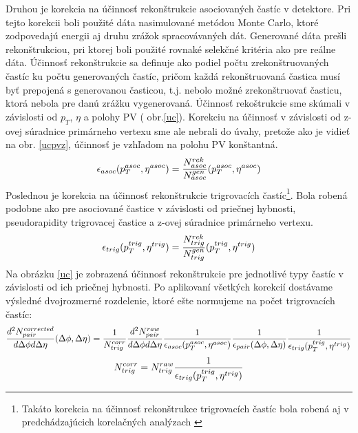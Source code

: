 \documentclass[thesismargins, thesislinespacing]{rnthesis}
\begin{document}
Druhou je korekcia na účinnosť rekonštrukcie asociovaných častíc v detektore. Pri tejto korekcii boli použité dáta nasimulované metódou Monte Carlo, ktoré zodpovedajú energii aj druhu zrážok spracovávaných dát. Generované dáta prešli re\-kon\-štruk\-ciou, pri ktorej boli použité rovnaké selekčné kritéria ako pre reálne dáta.  Účinnosť re\-kon\-štruk\-cie sa definuje ako podiel počtu zrekonštruovaných častíc ku počtu generovaných častíc, pričom každá rekonštruovaná častica musí byť prepojená s generovanou časticou, t.j. nebolo možné zrekonštruovať časticu, ktorá nebola pre danú zrážku vygenerovaná. Účinnosť rekoštrukcie sme skúmali v závislosti od $p_T$, $\eta$ a polohy PV ( obr.\ref{uc}). Korekciu na účinnosť v závislosti od z-ovej súradnice primárneho vertexu sme ale nebrali do úvahy, pretože ako je vidieť na obr. \ref{ucpvz}, účinnosť je vzhľadom na polohu PV konštantná.   
\begin{equation}
\footnotesize
\epsilon_{asoc}(p_{T}^{asoc},\eta^{asoc}) = \frac{N_{asoc}^{rek}}{N_{asoc}^{gen}}(p_{T}^{asoc},\eta^{asoc})
\end{equation}
Poslednou je korekcia na účinnosť rekonštrukcie trigrovacích častíc\footnote{Takáto korekcia na účinnosť rekonštrukce trigrovacích častíc bola robená aj v predchádzajúcich korelačných analýzach \cite{Jan-Fiete}}. Bola robená podobne ako pre asociované častice v závislosti od priečnej hybnosti, pseudorapidity trigrovacej častice a z-ovej súradnice primárneho vertexu. 
\begin{equation}
\footnotesize
\epsilon_{trig}(p_{T}^{trig},\eta^{trig}) = \frac{N_{trig}^{rek}}{N_{trig}^{gen}}(p_{T}^{trig},\eta^{trig})
\end{equation}
\begin{equation}\end{equation}
Na obrázku \ref{uc} je zobrazená účinnosť rekonštrukcie pre jednotlivé typy častíc v závislosti od ich priečnej hybnosti. Po aplikovaní všetkých korekcií dostávame výsledné dvojrozmerné rozdelenie, ktoré ešte normujeme na počet trigrovacích častíc:
\begin{equation}
\footnotesize
\frac{d^2N^{corrected}_{pair}}{d\Delta\phi d\Delta\eta}(\Delta\phi,\Delta \eta)=
\frac{1}{N^{corr}_{trig}} \frac{d^2N^{raw}_{pair}}{d\Delta\phi d\Delta\eta} \frac{1}{\epsilon_{asoc}(p_{T}^{asoc},\eta^{asoc})}\frac{1}{\epsilon_{pair}(\Delta\phi,\Delta\eta)}
\frac{1}{\epsilon_{trig}(p_{T}^{trig},\eta^{trig})}
\end{equation}
\begin{equation}
\footnotesize
N^{corr}_{trig}=N^{raw}_{trig}\frac{1}{\epsilon_{trig}(p_{T}^{trig},\eta^{trig})}
\end{equation}
\end{document}
